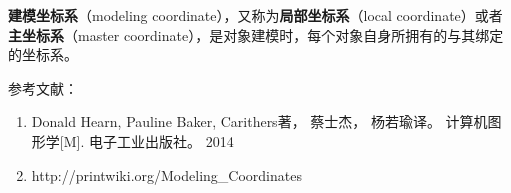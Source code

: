 
\textbf{建模坐标系}（modeling coordinate），又称为\textbf{局部坐标系}（local coordinate）或者\textbf{主坐标系}（master coordinate），是对象建模时，每个对象自身所拥有的与其绑定的坐标系。





参考文献：
\begin{enumerate}
\item Donald Hearn, Pauline Baker, Carithers著， 蔡士杰， 杨若瑜译。 计算机图形学[M]. 电子工业出版社。 2014
\item http://printwiki.org/Modeling\_Coordinates
\end{enumerate}
